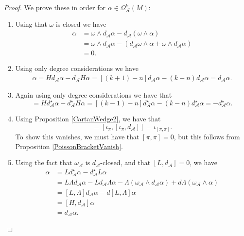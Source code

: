 \documentclass[10pt,a4paper]{amsart}
\newcommand{\A}{\mathcal{A}}
\begin{document}
 \begin{proof}
        We prove these in order for $\alpha \in \Omega_{\A}^k(M)$:
        \begin{enumerate}
            \item Using that $\omega$ is closed we have
            \begin{align*}
                [L,d_\A]\alpha &= \omega \wedge d_\A\alpha - d_\A(\omega \wedge \alpha) \\
                &= \omega \wedge d_\A \alpha - (d_\A\omega \wedge \alpha  +\omega \wedge d_\A \alpha) \\
                &= 0.
            \end{align*}
            \item Using only degree considerations we have
            \begin{align*}
               [H,d_\A]\alpha = Hd_\A \alpha  -d_\A H\alpha = [(k+1)-n]d_\A \alpha - (k-n)d_\A \alpha = d_\A \alpha.
            \end{align*}
            \item Again using only degree considerations we have that
            \begin{equation*}
                [H,d_\A^\star]=Hd_\A^\star \alpha - d_\A^\star H \alpha = [(k-1)-n]d_\A^\star \alpha - (k-n)d_\A^\star \alpha = -d_\A^\star \alpha.
            \end{equation*}
            \item Using Proposition \ref{CartanWedge2}, we have that
            \begin{equation*}
               [\Lambda,d_\A^\star] =[\iota_\pi,[\iota_\pi,d_\A]]=\iota_{[\pi,\pi]}.
            \end{equation*}
            To show this vanishes, we must have that $[\pi,\pi]=0$, but this follows from Proposition \ref{PoissonBracketVanish}.
            \item Using the fact that $\omega_\A$ is $d_\A$-closed, and that $[L,d_\A]=0$, we have
            \begin{align*}
                [L,d_\A^\star]\alpha &= Ld_\A^\star \alpha - d_\A^\star L\alpha \\
                &=L\Lambda d_\A \alpha - Ld_\A \Lambda \alpha - \Lambda(\omega_\A \wedge d_\A \alpha) + d \Lambda (\omega_\A \wedge \alpha) \\
                &=[L,\Lambda]d_\A \alpha - d[L,\Lambda]\alpha \\
                &= [H,d_\A]\alpha \\
                &=d_\A\alpha.
            \end{align*}
            

\end{enumerate}
\end{proof}
\end{document}

